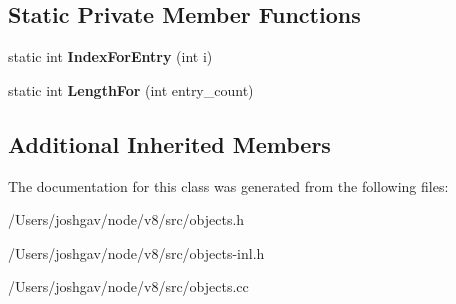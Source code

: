 \subsection*{Static Private Member Functions}
\begin{DoxyCompactItemize}
\item 
static int {\bfseries Index\+For\+Entry} (int i)\hypertarget{classv8_1_1internal_1_1_deoptimization_input_data_ada70caf1c5b44de4839dcaf7ce86c7b7}{}\label{classv8_1_1internal_1_1_deoptimization_input_data_ada70caf1c5b44de4839dcaf7ce86c7b7}

\item 
static int {\bfseries Length\+For} (int entry\+\_\+count)\hypertarget{classv8_1_1internal_1_1_deoptimization_input_data_a12a1eb305badfe4913ef43c0f7dd6160}{}\label{classv8_1_1internal_1_1_deoptimization_input_data_a12a1eb305badfe4913ef43c0f7dd6160}

\end{DoxyCompactItemize}
\subsection*{Additional Inherited Members}


The documentation for this class was generated from the following files\+:\begin{DoxyCompactItemize}
\item 
/\+Users/joshgav/node/v8/src/objects.\+h\item 
/\+Users/joshgav/node/v8/src/objects-\/inl.\+h\item 
/\+Users/joshgav/node/v8/src/objects.\+cc\end{DoxyCompactItemize}
